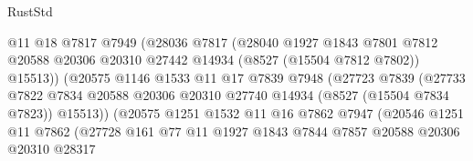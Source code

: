 \begin{lexlean}{RustStd}
\begin{coremodule}
                                @11
                                @18
                                @7817
                                @7949
                                (@28036
                                  @7817
                                  (@28040
                                    @1927
                                    @1843
                                    @7801
                                    @7812
                                    @20588
                                    @20306
                                    @20310
                                    @27442
                                    @14934
                                    (@8527 (@15504 @7812 @7802))
                                    @15513))
                                (@20575
                                  @1146
                                  @1533
                                  @11
                                  @17
                                  @7839
                                  @7948
                                  (@27723
                                    @7839
                                    (@27733
                                      @7822
                                      @7834
                                      @20588
                                      @20306
                                      @20310
                                      @27740
                                      @14934
                                      (@8527 (@15504 @7834 @7823))
                                      @15513))
                                  (@20575
                                    @1251
                                    @1532
                                    @11
                                    @16
                                    @7862
                                    @7947
                                    (@20546
                                      @1251
                                      @11
                                      @7862
                                      (@27728
                                        @161
                                        @77
                                        @11
                                        @1927
                                        @1843
                                        @7844
                                        @7857
                                        @20588
                                        @20306
                                        @20310
                                        @28317

\end{coremodule}
\end{lexlean}
